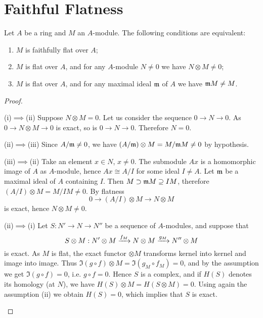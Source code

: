 \documentclass[../main]{subfiles}
\begin{document}
\section{Faithful Flatness}\label{sec:04}

\begin{partheorem}\label{thm:002}
    Let $A$ be a ring and $M$ an $A$-module. The following conditions are equivalent:
    \begin{enumerate}[label=(\roman*)]
        \item $M$ is faithfully flat over $A$;
        \item $M$ is flat over $A$, and for any $A$-module $N \ne 0$ we have $N \otimes M \ne 0$;
        \item $M$ is flat over $A$, and for any maximal ideal $\mathfrak{m}$ of $A$ we have $\mathfrak{m}M \ne M$.
    \end{enumerate}
\end{partheorem}
\begin{proof}\phantom{,}
    \begin{implyenumerate}
        \item[(i)$\implies$(ii)] Suppose $N \otimes M = 0$. Let us consider the sequence $0 \longrightarrow N \longrightarrow 0$. As $0 \longrightarrow N \otimes M \longrightarrow 0$ is exact, so is $0 \longrightarrow N \longrightarrow 0$. Therefore $N = 0$.
        \item[(ii)$\implies$(iii)] Since $A/\mathfrak{m} \ne 0$, we have $(A/\mathfrak{m}) \otimes M = M/\mathfrak{m}M \ne 0$ by hypothesis.
        \item[(iii)$\implies$(ii)] Take an element $x \in N$, $x \ne 0$. The submodule $Ax$ is a homomorphic image of $A$ as $A$-module, hence $Ax \cong A/I$ for some ideal $I \ne A$. Let $\mathfrak{m}$ be a maximal ideal of $A$ containing $I$. Then $M \supset \mathfrak{m}M \supseteq IM$, therefore $(A/I) \otimes M = M/IM \ne 0$. By flatness \[0 \longrightarrow (A/I) \otimes M \longrightarrow N \otimes M\] is exact, hence $N \otimes M \ne 0$.
        \item[(ii)$\implies$(i)] Let $S: N' \longrightarrow N \longrightarrow N''$ be a sequence of $A$-modules, and suppose that
        \[ S \otimes M : N' \otimes M \varrightarrow{f_M} N \otimes M \varrightarrow{g_M} N'' \otimes M \]
        is exact. As $M$ is flat, the exact functor $\otimes M$ transforms kernel into kernel and image into image. Thus $\Im(g\circ f) \otimes M = \Im(g_M \circ f_M) = 0$, and by the assumption we get $\Im(g\circ f) = 0$, i.e. $g\circ f = 0$. Hence $S$ is a complex, and if $H(S)$ denotes its homology (at $N$), we have $H(S) \otimes M = H(S \otimes M) = 0$. Using again the assumption (ii) we obtain $H(S) = 0$, which implies that $S$ is exact.
    \end{implyenumerate}
 
\end{proof}
\end{document}

